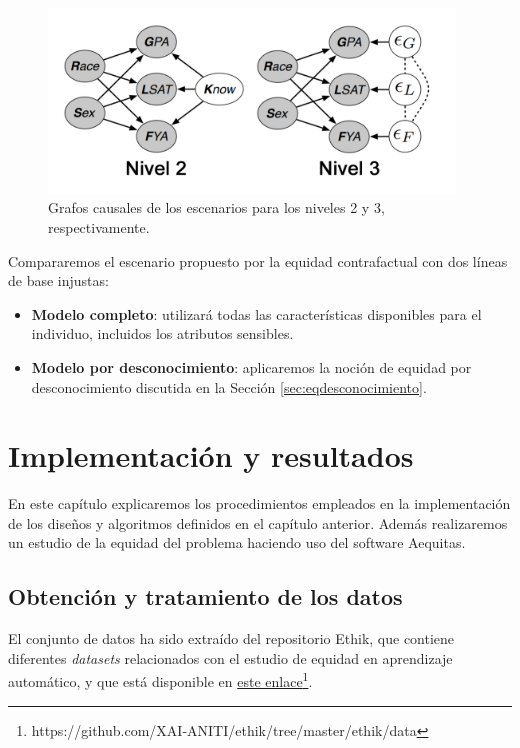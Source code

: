 \documentclass[oneside,openright,titlepage,numbers=noenddot,openany,headinclude,footinclude=true,
cleardoublepage=empty,abstractoff,BCOR=5mm,paper=a4,fontsize=12pt,main=spanish]{scrreprt}
\begin{document}
\begin{figure}[h]
	\centering
	\includegraphics[width=10.8cm]{causales_pract.png}
	\caption{Grafos causales de los escenarios para los niveles 2 y 3, respectivamente.}
    \label{fig:practicausales}
\end{figure}

Compararemos el escenario propuesto por la equidad contrafactual con dos líneas de base injustas: 

\begin{itemize}
    \item \textbf{Modelo completo}: utilizará todas las características disponibles para el individuo, incluidos los atributos sensibles.
    \item \textbf{Modelo por desconocimiento}: aplicaremos la noción de equidad por desconocimiento discutida en la Sección \ref{sec:eqdesconocimiento}.
\end{itemize} 

\chapter{Implementación y resultados} \label{ch:implementaresult}

En este capítulo explicaremos los procedimientos empleados en la implementación de los diseños y algoritmos definidos en el capítulo anterior. Además realizaremos un estudio de la equidad del problema haciendo uso del software Aequitas.

\section{Obtención y tratamiento de los datos}

El conjunto de datos ha sido extraído del repositorio Ethik, que contiene diferentes \textit{datasets} relacionados con el estudio de equidad en aprendizaje automático, y que está disponible en \href{https://github.com/XAI-ANITI/ethik/tree/master/ethik/data}{este enlace}\footnote{https://github.com/XAI-ANITI/ethik/tree/master/ethik/data}.
\end{document}
